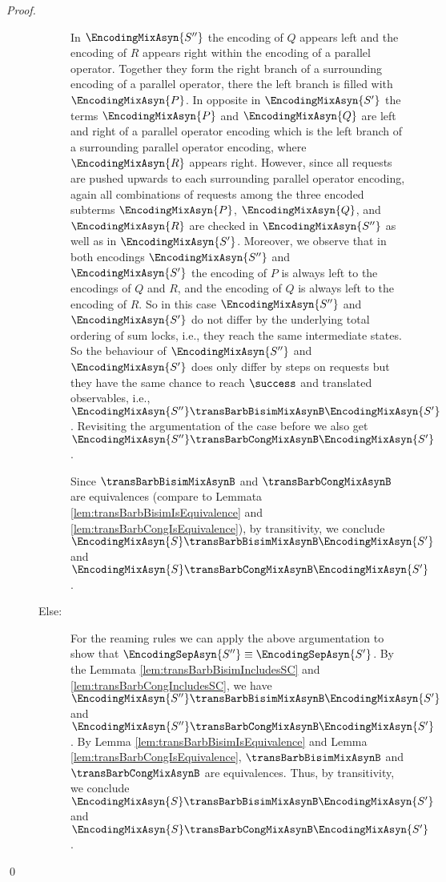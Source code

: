 \documentclass[]{llncs}
\begin{document}
\begin{proof}
\begin{description}
\begin{description}
				In $ \EncodingMixAsyn{S''} $ the encoding of $ Q $ appears left and the encoding of $ R $ appears right within the encoding of a parallel operator. Together they form the right branch of a surrounding encoding of a parallel operator, there the left branch is filled with $ \EncodingMixAsyn{P} $. In opposite in $ \EncodingMixAsyn{S'} $ the terms $ \EncodingMixAsyn{P} $ and $ \EncodingMixAsyn{Q} $ are left and right of a parallel operator encoding which is the left branch of a surrounding parallel operator encoding, where $ \EncodingMixAsyn{R} $ appears right. However, since all requests are pushed upwards to each surrounding parallel operator encoding, again all combinations of requests among the three encoded subterms $ \EncodingMixAsyn{P} $, $ \EncodingMixAsyn{Q} $, and $ \EncodingMixAsyn{R} $ are checked in $ \EncodingMixAsyn{S''} $ as well as in $ \EncodingMixAsyn{S'} $. Moreover, we observe that in both encodings $ \EncodingMixAsyn{S''} $ and $ \EncodingMixAsyn{S'} $ the encoding of $ P $ is always left to the encodings of $ Q $ and $ R $, and the encoding of $ Q $ is always left to the encoding of $ R $. So in this case $ \EncodingMixAsyn{S''} $ and $ \EncodingMixAsyn{S'} $ do not differ by the underlying total ordering of sum locks, i.e., they reach the same intermediate states. So the behaviour of $ \EncodingMixAsyn{S''} $ and $ \EncodingMixAsyn{S'} $ does only differ by \pure \admin steps on requests but they have the same chance to reach $ \success $ and translated observables, i.e., $ \EncodingMixAsyn{S''} \transBarbBisimMixAsynB \EncodingMixAsyn{S'} $. Revisiting the argumentation of the case before we also get $ \EncodingMixAsyn{S''} \transBarbCongMixAsynB \EncodingMixAsyn{S'} $.
				
				Since $ \transBarbBisimMixAsynB $ and $ \transBarbCongMixAsynB $ are equivalences (compare to Lemmata \ref{lem:transBarbBisimIsEquivalence} and \ref{lem:transBarbCongIsEquivalence}), by transitivity, we conclude $ \EncodingMixAsyn{S} \transBarbBisimMixAsynB \EncodingMixAsyn{S'} $ and $ \EncodingMixAsyn{S} \transBarbCongMixAsynB \EncodingMixAsyn{S'} $.
			\item[Else:] For the reaming rules we can apply the above argumentation to show that $ \EncodingSepAsyn{S''} \equiv \EncodingSepAsyn{S'} $. By the Lemmata \ref{lem:transBarbBisimIncludesSC} and \ref{lem:transBarbCongIncludesSC}, we have $ \EncodingMixAsyn{S''} \transBarbBisimMixAsynB \EncodingMixAsyn{S'} $ and $ \EncodingMixAsyn{S''} \transBarbCongMixAsynB \EncodingMixAsyn{S'} $. By Lemma \ref{lem:transBarbBisimIsEquivalence} and Lemma \ref{lem:transBarbCongIsEquivalence}, $ \transBarbBisimMixAsynB $ and $ \transBarbCongMixAsynB $ are equivalences. Thus, by transitivity, we conclude $ \EncodingMixAsyn{S} \transBarbBisimMixAsynB \EncodingMixAsyn{S'} $ and $ \EncodingMixAsyn{S} \transBarbCongMixAsynB \EncodingMixAsyn{S'} $.
		\end{description}
	\end{description}
	\qed
\end{proof}
\end{document}
